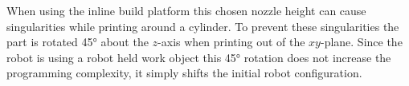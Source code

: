 \documentclass[main.tex]{subfiles}
\begin{document}
When using the inline build platform this chosen nozzle height can cause singularities while printing around a cylinder.
To prevent these singularities the part is rotated \ang{45} about the $z$\nobreakdash-axis when printing out of the $xy$\nobreakdash-plane.
Since the robot is using a robot held work object this \ang{45} rotation does not increase the programming complexity, it simply shifts the initial robot configuration.
\end{document}
